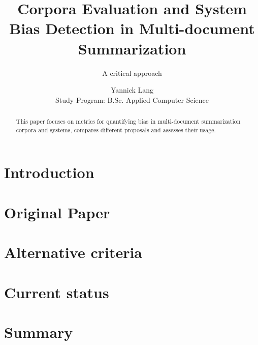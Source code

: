 \documentclass[runningheads]{llncs}
\begin{document}
\title{Corpora Evaluation and System Bias Detection in Multi-document Summarization}
\subtitle{A critical approach}
\author{Yannick Lang \\
    \small Study Program: B.Sc. Applied Computer Science }

\maketitle              %


\begin{abstract}
    This paper focuses   on metrics for quantifying bias in multi-document summarization corpora and systems, compares different proposals and assesses their usage.
    
    
\end{abstract}

\section{Introduction}
\label{sec:introcution}


\section{Original Paper}
\label{sec:original-paper}


\section{Alternative criteria}
\label{sec:alternative-criteria}


\section{Current status}
\label{sec:current-status}


\section{Summary}
\label{sec:summary}





\end{document}
